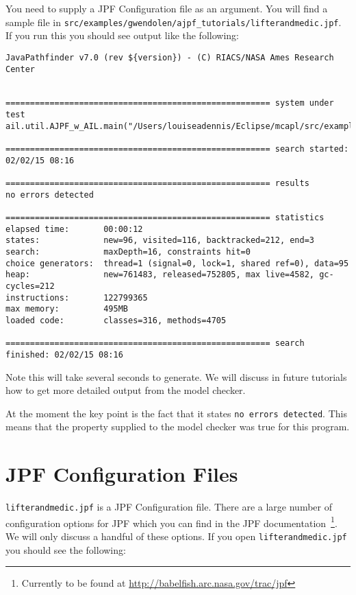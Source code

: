 You need to supply a JPF Configuration file as an argument.  You will find a sample file in \texttt{src/examples/gwendolen/ajpf\_tutorials/lifterandmedic.jpf}.  If you run this you should see output like the following:

\begin{verbatim}
JavaPathfinder v7.0 (rev ${version}) - (C) RIACS/NASA Ames Research Center


====================================================== system under test
ail.util.AJPF_w_AIL.main("/Users/louiseadennis/Eclipse/mcapl/src/examples/gwendolen/ail_tutorials/tutorial1/answers/ex2.ail","/Users/louiseadennis/Eclipse/mcapl/src/examples/gwendolen/ajpf_tutorials/tutorial1/lifterandmedic.psl","1")

====================================================== search started: 02/02/15 08:16

====================================================== results
no errors detected

====================================================== statistics
elapsed time:       00:00:12
states:             new=96, visited=116, backtracked=212, end=3
search:             maxDepth=16, constraints hit=0
choice generators:  thread=1 (signal=0, lock=1, shared ref=0), data=95
heap:               new=761483, released=752805, max live=4582, gc-cycles=212
instructions:       122799365
max memory:         495MB
loaded code:        classes=316, methods=4705

====================================================== search finished: 02/02/15 08:16
\end{verbatim}

Note this will take several seconds to generate.  We will discuss in future tutorials how to get more detailed output from the model checker.

At the moment the key point is the fact that it states \texttt{no errors detected}.  This means that the property supplied to the model checker was true for this program.

\section{JPF Configuration Files}

\texttt{lifterandmedic.jpf} is a JPF Configuration file.  There are a large number of configuration options for JPF which you can find in the JPF documentation~\footnote{Currently to be found at \url{http://babelfish.arc.nasa.gov/trac/jpf}}.  We will only discuss a handful of these options.  If you open \texttt{lifterandmedic.jpf} you should see the following:

